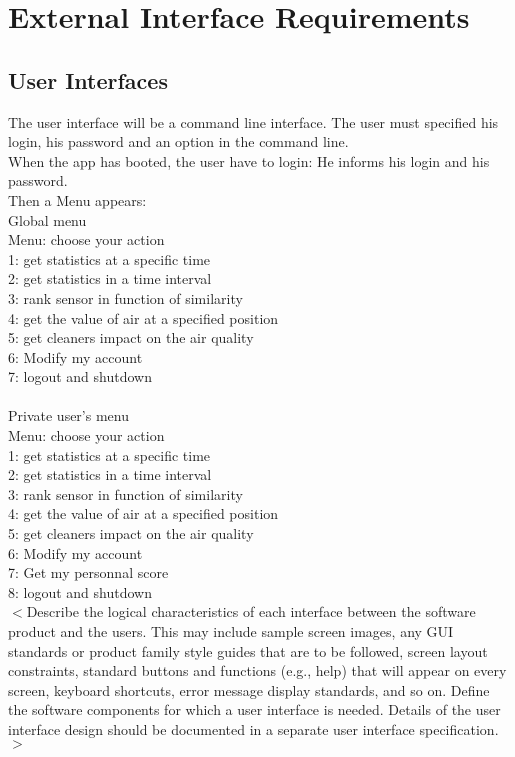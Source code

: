 \documentclass{report}
\begin{document}
\chapter{External Interface Requirements}

\section{User Interfaces}
The user interface will be a command line interface. The user must specified
his login, his password and an option in the command line.
\\
When the app has booted, the user have to login: He informs his login and his password.
\\
Then a Menu appears:
\\ Global menu \\
Menu: choose your action\\
1: get statistics at a specific time\\
2: get statistics in a time interval\\
3: rank sensor in function of similarity\\
4: get the value of air at a specified position\\
5: get cleaners impact on the air quality\\
6: Modify my account\\
7: logout and shutdown\\
\\ Private user's menu \\
Menu: choose your action\\
1: get statistics at a specific time\\
2: get statistics in a time interval\\
3: rank sensor in function of similarity\\
4: get the value of air at a specified position\\
5: get cleaners impact on the air quality\\
6: Modify my account\\
7: Get my personnal score\\
8: logout and shutdown\\


$<$Describe the logical characteristics of each interface between the software
product and the users. This may include sample screen images, any GUI standards
or product family style guides that are to be followed, screen layout
constraints, standard buttons and functions (e.g., help) that will appear on
every screen, keyboard shortcuts, error message display standards, and so on.
Define the software components for which a user interface is needed. Details of
the user interface design should be documented in a separate user interface
specification.$>$
\end{document}
